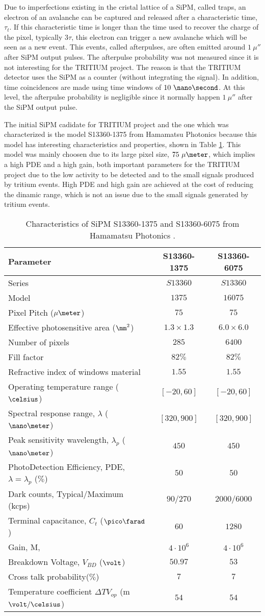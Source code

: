 Due to imperfections existing in the cristal lattice of a SiPM, called traps, an electron of an avalanche can be captured and released after a characteristic time, $\tau_t$. If this characteristic time is longer than the time used to recover the charge of the pixel, typically $3\tau$, this electron can trigger a new avalanche which will be seen as a new event. This events, called  afterpulses, are often emitted around $1~\mu\second$ after SiPM output pulses. The afterpulse probability was not measured since it is not interesting for the TRITIUM project. The reason is that the TRITIUM detector uses the SiPM as a counter (without integrating the signal). In addition, time coincidences are made using time windows of $10~\nano\second$. At this level, the afterpulse probability is negligible since it normally happen $1~\mu\second$ after the SiPM output pulse.

The initial SiPM cadidate for TRITIUM project and the one which was characterized is the model S13360-1375 from Hamamatsu Photonics \cite{DataSheetHammamatsu_1_SiPM_1375} because this model has interesting characteristics and properties, shown in Table \ref{tab:PropertiesOfSiPM1375}. This model was mainly choosen due to its large pixel size, $75~\mu\meter$, which implies a high PDE and a high gain, both important parameters for the TRITIUM project due to the low activity to be detected and to the small signals produced by tritium events. High PDE and high gain are achieved at the cost of reducing the dinamic range, which is not an issue due to the small signals generated by tritium events. 

\begin{table}[htbp]
\centering{}%
\begin{tabular}{lcc}
\toprule 
Parameter & S13360-1375 & S13360-6075 \tabularnewline
\midrule
\midrule 
Series & $S13360$ & $S13360$ \tabularnewline
Model & $1375$ & $16075$ \tabularnewline
Pixel Pitch ($\mu\meter$) & $75$ & $75$ \tabularnewline
Effective photosensitive area ($\mm^2$) & $1.3 \times 1.3$ & $6.0 \times 6.0$ \tabularnewline
Number of pixels & $285$ & $6400$ \tabularnewline
Fill factor & $82\%$ & $82\%$ \tabularnewline
Refractive index of windows material & $1.55$ & $1.55$ \tabularnewline
Operating temperature range ($\celsius$) & $[-20,60]$ & $[-20,60]$ \tabularnewline
Spectral response range, $\lambda$ ($\nano\meter$) & $[320, 900]$ & $[320, 900]$ \tabularnewline
Peak sensitivity wavelength, $\lambda_p$ ($\nano\meter$) & $450$ & $450$ \tabularnewline
PhotoDetection Efficiency, PDE, $\lambda=\lambda_p$ ($\%$) & $50$ & $50$ \tabularnewline
Dark counts, Typical/Maximum (kcps) & $90/270$ & $2000/6000$ \tabularnewline
Terminal capacitance, $C_t$ ($\pico\farad$) & $60$ & $1280$ \tabularnewline
Gain, M, & $4 \cdot{} 10^6$ & $4 \cdot{} 10^6$ \tabularnewline
Breakdown Voltage, $V_{BD}$ ($\volt$) & $50.97$ & $53$ \tabularnewline
Cross talk probability($\%$) & $7$ & $7$ \tabularnewline
Temperature coefficient $\Delta TV_{op}$ (m$\volt/\celsius$) & $54$ & $54$ \tabularnewline
\bottomrule
\end{tabular}
\caption{Characteristics of SiPM S13360-1375 and S13360-6075 from Hamamatsu Photonics \cite{DataSheetHammamatsu_1_SiPM_1375}.}
\label{tab:PropertiesOfSiPM1375}
\end{table}

